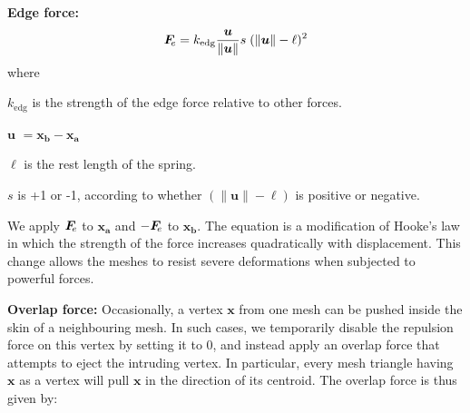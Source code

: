 \medskip
\textbf{Edge force:} 
\begin{equation}
\label{eq_edge_force}
\simforce{e} =  k_\mathrm{edg} \frac{\bm{u}}{\| \bm{u} \|} s \; ( \| \bm{u} \| - \ell)^2
\end{equation}
where
\begin{packeddescriptions}
	\item[$k_\mathrm{edg}$] is the strength of the edge force relative to other forces.
	\item[$\bm{u}$] $= \bm{x_{b}} - \bm{x_{a}}$
	\item[$\ell$] is the rest length of the spring.
	\item[$s$] is +1 or -1, according to whether $(\| \bm{u} \| - \ell)$ 
		is positive or negative.
\end{packeddescriptions}

We apply $\simforce{e}$ to $\bm{x_{a}}$ and $-\simforce{e}$ to $\bm{x_{b}}$.
The equation is a modification of Hooke's law
in which the strength of the force increases quadratically
with displacement.
This change allows the meshes to resist severe deformations
when subjected to powerful forces.




\medskip
\textbf{Overlap force:}
Occasionally, a vertex $\bm{x}$ from one mesh can be pushed inside the skin of a
neighbouring mesh.  In such cases, we temporarily disable the repulsion force
on this vertex
by setting it to 0, and instead apply an overlap force that attempts to
eject the intruding vertex.  In particular, every mesh triangle having $\bm{x}$
as a vertex will pull $\bm{x}$ in the direction of its centroid.  The overlap
force is thus given by:

